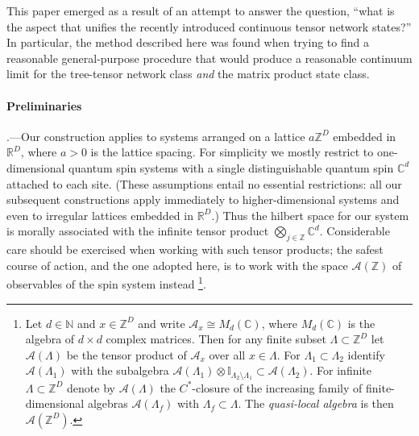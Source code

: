 \documentclass[prl,twocolumn,lengthcheck,superscriptaddress]{revtex4-1}
\theoremstyle{definition}
\theoremstyle{remark}
\begin{document}
This paper emerged as a result of an attempt to answer the question, ``what is the aspect that unifies the recently introduced continuous tensor network states?'' In particular, the method described here was found when trying to find a reasonable general-purpose procedure that would produce a reasonable continuum limit for the tree-tensor network class \emph{and} the matrix product state class.

\paragraph{Preliminaries}\hspace{-1em}.---Our construction applies to systems arranged on a lattice $a\mathbb{Z}^D$ embedded in $\mathbb{R}^D$, where $a>0$ is the lattice spacing. For simplicity we mostly restrict to one-dimensional quantum spin systems with a single distinguishable quantum spin $\mathbb{C}^d$ attached to each site. (These assumptions entail no essential restrictions: all our subsequent constructions apply immediately to higher-dimensional systems and even to irregular lattices embedded in $\mathbb{R}^D$.) Thus the hilbert space for our system is morally associated with the infinite tensor product $\bigotimes_{j\in\mathbb{Z}} \mathbb{C}^d$. Considerable care should be exercised when working with such tensor products; the safest course of action, and the one adopted here, is to work with the space $\mathcal{A}(\mathbb{Z})$ of observables of the spin system instead \footnote{Let $d\in \mathbb{N}$ and $x \in \mathbb{Z}^D$ and write $\mathcal{A}_x  \cong M_d(\mathbb{C})$, where $M_d(\mathbb{C})$ is the algebra of $d\times d$ complex matrices. Then for any finite subset $\Lambda \subset \mathbb{Z}^D$ let $\mathcal{A}(\Lambda)$ be the tensor product of $\mathcal{A}_x$ over all $x\in \Lambda$. For $\Lambda_1\subset \Lambda_2$ identify $\mathcal{A}(\Lambda_1)$ with the subalgebra $\mathcal{A}(\Lambda_1)\otimes \mathbb{I}_{\Lambda_2\setminus \Lambda_1} \subset \mathcal{A}(\Lambda_2)$. For infinite $\Lambda \subset \mathbb{Z}^D$ denote by $\mathcal{A}(\Lambda)$ the $C^*$-closure of the increasing family of finite-dimensional algebras $\mathcal{A}(\Lambda_f)$ with $\Lambda_f \subset \Lambda$. The \emph{quasi-local algebra} is then $\mathcal{A}(\mathbb{Z}^D)$.}.
\end{document}
